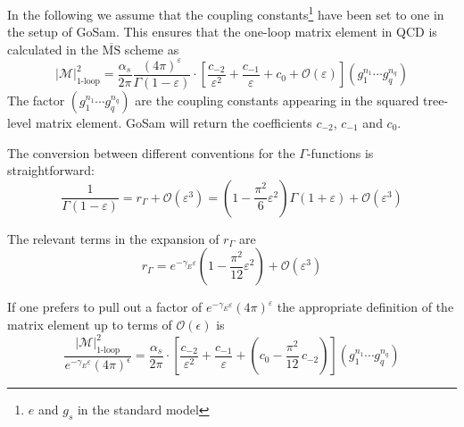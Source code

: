 \documentclass[11pt,a4paper]{refrep}
\newcommand{\gosamversion}{{3{.}0}}
\newcommand{\gosamv}[1][\gosamversion]{{\sc GoSam}\xspace}
\begin{document}
In the following we assume that the coupling constants\footnote{
$e$ and $g_s$ in the standard model} have been set to one in the
setup of \gosamv{}. This ensures that the one-loop matrix
element in QCD is calculated in the $\overline{\mathrm{MS}}$ scheme as
\begin{equation}
\left\vert\mathcal{M}\right\vert^2_{\text{1-loop}}=
\frac{\alpha_s}{2\pi}\frac{(4\pi)^\varepsilon}{\Gamma(1-\varepsilon)}
\cdot\left[\frac{c_{-2}}{\varepsilon^2}+\frac{c_{-1}}{\varepsilon}+c_0
+{\mathcal{O}}(\varepsilon)\right](g_1^{n_1}\cdots g_q^{n_q})
\end{equation}
The factor $(g_1^{n_1}\cdots g_q^{n_q})$ are the coupling constants
appearing in the squared tree-level matrix element. \gosamv{} will
return the coefficients $c_{-2}$, $c_{-1}$ and $c_0$.

The conversion between different conventions for the $\Gamma$-functions
is straightforward:
\begin{equation}
\frac{1}{\Gamma(1-\varepsilon)}=r_\Gamma+{\mathcal O}(\varepsilon^3)=
\left(1-\frac{\pi^2}{6}\varepsilon^2\right)\Gamma(1+\varepsilon)
   +{\mathcal O}(\varepsilon^3)
\end{equation}

The relevant terms in the expansion of $r_\Gamma$ are
\begin{equation}
r_\Gamma=e^{-\gamma_E\varepsilon}
\left(1-\frac{\pi^2}{12}\varepsilon^2\right)+\mathcal{O}(\varepsilon^3)
\end{equation}

If one prefers to pull out a factor of
$e^{-\gamma_E\varepsilon}(4\pi)^{\varepsilon}$ the appropriate
definition of the matrix element up to terms of $\mathcal{O}(\epsilon)$ is
\begin{equation}
\frac{\left\vert\mathcal{M}\right\vert^2_{\text{1-loop}}}%
{e^{-\gamma_E\varepsilon}(4\pi)^\epsilon}=
\frac{\alpha_s}{2\pi}
\cdot\left[\frac{c_{-2}}{\varepsilon^2}+\frac{c_{-1}}{\varepsilon}
+\left(c_0-\frac{\pi^2}{12}\,c_{-2}\right)
\right](g_1^{n_1}\cdots g_q^{n_q})
\end{equation}

\end{document}
